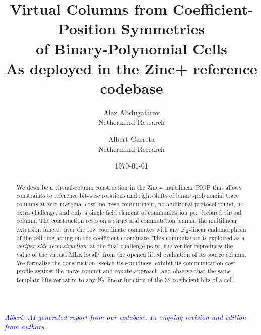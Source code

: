 \documentclass[11pt]{article}
\title{Virtual Columns from Coefficient-Position Symmetries \\
       of Binary-Polynomial Cells \\
       \large As deployed in the Zinc+ reference codebase}
\author{Alex Abdugafarov \\[2pt] \normalsize Nethermind Research \and Albert Garreta \\[2pt] \normalsize Nethermind Research}
\date{\today}
\begin{document}
\maketitle

\begin{center}
\textcolor{blue}{\textit{Albert: AI generated report from our codebase. In ongoing revision and edition from authors.}}
\end{center}
\vspace{0.5em}

\begin{abstract}
We describe a virtual-column construction in the Zinc+ multilinear PIOP
that allows constraints to reference bit-wise rotations and right-shifts
of binary-polynomial trace columns at zero marginal cost: no fresh
commitment, no additional protocol round, no extra challenge, and only
a single field element of communication per declared virtual column.
The construction rests on a structural commutation lemma: the
multilinear extension functor over the row coordinate commutes with
any $\mathbb{F}_2$-linear endomorphism of the cell ring acting on the
coefficient coordinate. This commutation is exploited as a
\emph{verifier-side reconstruction}: at the final challenge point, the
verifier reproduces the value of the virtual MLE locally from the
opened lifted evaluation of its source column. We formalise the
construction, sketch its soundness, exhibit its communication-cost
profile against the naive commit-and-equate approach, and observe that
the same template lifts verbatim to any $\mathbb{F}_2$-linear function of the
$32$ coefficient bits of a cell.
\end{abstract}

\tableofcontents








\end{document}
